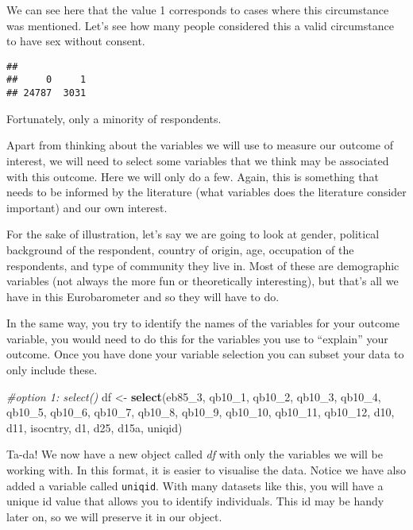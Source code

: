 \documentclass[
]{book}
\newenvironment{Shaded}{\begin{snugshade}}{\end{snugshade}}
\newcommand{\CommentTok}[1]{\textcolor[rgb]{0.56,0.35,0.01}{\textit{#1}}}
\newcommand{\FunctionTok}[1]{\textcolor[rgb]{0.13,0.29,0.53}{\textbf{#1}}}
\newcommand{\NormalTok}[1]{#1}
\newcommand{\OtherTok}[1]{\textcolor[rgb]{0.56,0.35,0.01}{#1}}
\newcommand{\SpecialCharTok}[1]{\textcolor[rgb]{0.81,0.36,0.00}{\textbf{#1}}}
\begin{document}
We can see here that the value 1 corresponds to cases where this circumstance was mentioned. Let's see how many people considered this a valid circumstance to have sex without consent.

\begin{Shaded}
\end{Shaded}

\begin{verbatim}
## 
##     0     1 
## 24787  3031
\end{verbatim}

Fortunately, only a minority of respondents.

Apart from thinking about the variables we will use to measure our outcome of interest, we will need to select some variables that we think may be associated with this outcome. Here we will only do a few. Again, this is something that needs to be informed by the literature (what variables does the literature consider important) and our own interest.

For the sake of illustration, let's say we are going to look at gender, political background of the respondent, country of origin, age, occupation of the respondents, and type of community they live in. Most of these are demographic variables (not always the more fun or theoretically interesting), but that's all we have in this Eurobarometer and so they will have to do.

In the same way, you try to identify the names of the variables for your outcome variable, you would need to do this for the variables you use to ``explain'' your outcome. Once you have done your variable selection you can subset your data to only include these.

\begin{Shaded}
\begin{Highlighting}[]
\CommentTok{\#option 1: select()}
\NormalTok{df }\OtherTok{\textless{}{-}} \FunctionTok{select}\NormalTok{(eb85\_3, qb10\_1, qb10\_2, qb10\_3, qb10\_4,}
\NormalTok{             qb10\_5, qb10\_6, qb10\_7, qb10\_8, qb10\_9,}
\NormalTok{             qb10\_10, qb10\_11, qb10\_12, d10, d11,}
\NormalTok{             isocntry, d1, d25, d15a, uniqid)}
\end{Highlighting}
\end{Shaded}

Ta-da! We now have a new object called \emph{df} with only the variables we will be working with. In this format, it is easier to visualise the data. Notice we have also added a variable called \texttt{uniqid}. With many datasets like this, you will have a unique id value that allows you to identify individuals. This id may be handy later on, so we will preserve it in our object.
\end{document}
